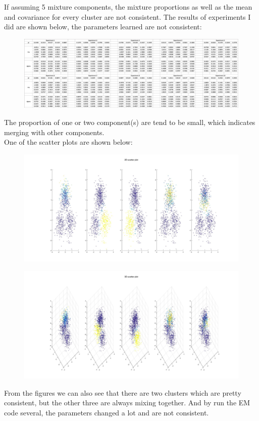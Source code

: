 \documentclass[a4paper]{article}
\begin{document}
\begin{spacing}{2.0}
\begin{enumerate}[(1)]
If assuming 5 mixture components, the mixture proportions as well as the mean and covariance for every cluster are not consistent. The results of experiments I did are shown below, the parameters learned are not consistent:
\begin{figure}[H]
\centering
\includegraphics[width = 7in]{EM5.jpg}
\end{figure}
The proportion of one or two component(s) are tend to be small, which indicates merging with other components.\\
One of the scatter plots are shown below:
\begin{figure}[H]
\centering
\includegraphics[width = 6in]{scatter2d5.jpg}
\end{figure}

\begin{figure}[H]
\centering
\includegraphics[width = 6in]{scatter3d5.jpg}
\end{figure}
From the figures we can also see that there are two clusters which are pretty consistent, but the other three are always mixing together. And by run the EM code several, the parameters changed a lot and are not consistent. \\


\end{enumerate}
\end{spacing}
\end{document}
